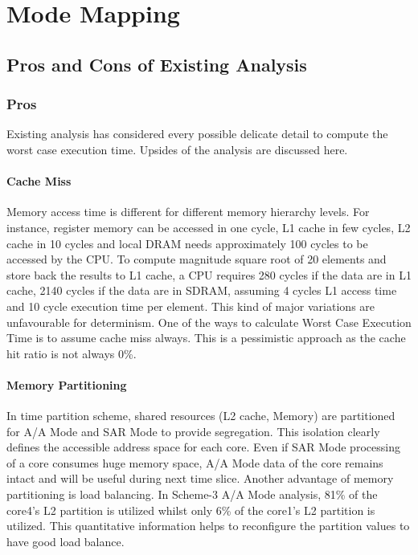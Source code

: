\chapter{Mode Mapping}
\label{chap:mode_mapping}

\section{Pros and Cons of Existing Analysis}
\label{sec:mm:pros_n_cons}

\subsection{Pros}
\label{mm:pros}
Existing analysis has considered every possible delicate detail to compute the worst case execution time. Upsides of the analysis are discussed here.

\subsubsection{Cache Miss}
Memory access time is different for different memory hierarchy levels. For instance, register memory can be accessed in one cycle, L1 cache in few cycles, L2 cache in 10 cycles and local DRAM needs approximately 100 cycles to be accessed by the CPU. To compute magnitude square root of 20 elements and store back the results to L1 cache, a CPU requires 280 cycles if the data are in L1 cache, 2140 cycles if the data are in SDRAM, assuming 4 cycles L1 access time and 10 cycle execution time per element. This kind of major variations are unfavourable for determinism. One of the ways to calculate Worst Case Execution Time is to assume cache miss always. This is a pessimistic approach as the cache hit ratio is not always 0\%. 

\subsubsection{Memory Partitioning}
In time partition scheme, shared resources (L2 cache, Memory) are partitioned for A/A Mode and SAR Mode to provide segregation. This isolation clearly defines the accessible address space for each core. Even if SAR Mode processing of a core consumes huge memory space, A/A Mode data of the core remains intact and will be useful during next time slice. Another advantage of memory partitioning is load balancing. In Scheme-3 A/A Mode analysis, 81\% of the core4's L2 partition is utilized whilst only 6\% of the core1's L2 partition is utilized. This quantitative information helps to reconfigure the partition values to have good load balance.


